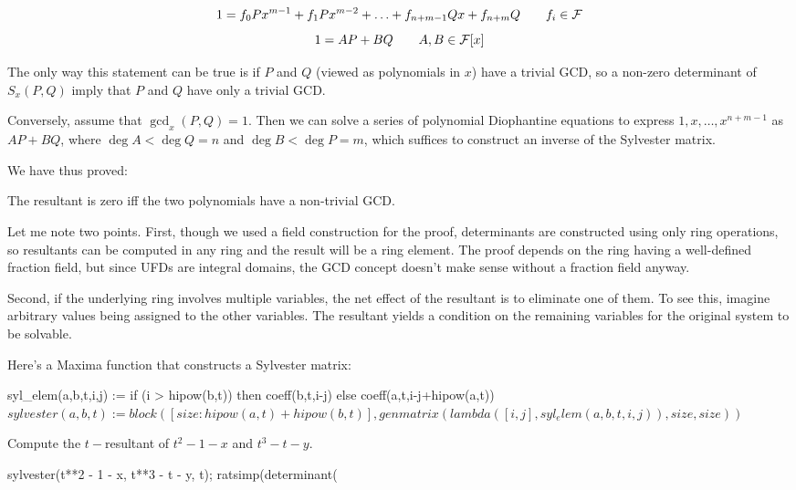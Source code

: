 $$ 1 = f_0 P x^{m-1} + f_1 P x^{m-2} + \ldots + f_{n+m-1} Q x + f_{n+m} Q \qquad f_i \in {\cal F}$$
$$ 1 = A P + B Q \qquad A,B \in {\cal F}[x] $$

The only way this statement can be true is if $P$ and $Q$ (viewed
as polynomials in $x$) have a
trivial GCD, so a non-zero determinant of $S_x(P,Q)$ imply that $P$ and
$Q$ have only a trivial GCD.

Conversely, assume that $\gcd_x(P,Q) = 1$.  Then we can solve a series
of polynomial Diophantine equations to express $1, x, \ldots,
x^{n+m-1}$ as $AP+BQ$, where $\deg A < \deg Q = n$ and $\deg B <
\deg P = m$, which suffices to construct an inverse of the Sylvester
matrix.

We have thus proved:

\begin{theorem}\label{resultant theorem}
The resultant is zero iff the two polynomials have a non-trivial GCD.
\end{theorem}

Let me note two points.  First, though we used a field construction
for the proof, determinants are constructed using only ring
operations, so resultants can be computed in any ring and the result
will be a ring element.  The proof depends on the ring having a
well-defined fraction field, but since UFDs are integral domains, the
GCD concept doesn't make sense without a fraction field anyway.

Second, if the underlying ring involves multiple variables, the net
effect of the resultant is to eliminate one of them.  To see this,
imagine arbitrary values being assigned to the other variables.  The
resultant yields a condition on the remaining variables for the
original system to be solvable.


\vfill\eject

Here's a Maxima function that constructs a Sylvester matrix:

\begin{maximablock}
syl_elem(a,b,t,i,j) :=
   if (i > hipow(b,t))
      then coeff(b,t,i-j)
      else coeff(a,t,i-j+hipow(a,t))$
sylvester(a,b,t) := block(
   [size: hipow(a,t) + hipow(b,t)],
   genmatrix(lambda([i,j], syl_elem(a,b,t,i,j)),
             size, size)
)$
\end{maximablock}

\example Compute the $t-$resultant of $t^2 - 1 -x$ and $t^3-t-y$.

\begin{maximablock}

sylvester(t**2 - 1 - x, t**3 - t - y, t);
ratsimp(determinant(%
\end{maximablock}

